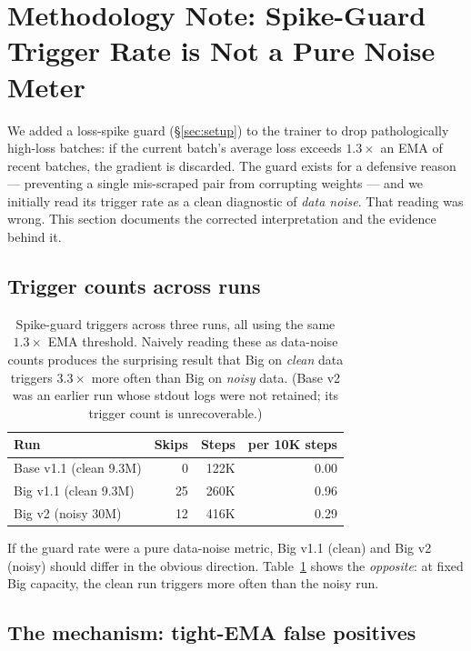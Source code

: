 \section{Methodology Note: Spike-Guard Trigger Rate is Not a Pure Noise Meter}
\label{sec:methodology}

We added a loss-spike guard (\S\ref{sec:setup}) to the trainer to drop pathologically high-loss batches: if the current batch's average loss exceeds $1.3\times$ an EMA of recent batches, the gradient is discarded. The guard exists for a defensive reason --- preventing a single mis-scraped pair from corrupting weights --- and we initially read its trigger rate as a clean diagnostic of \emph{data noise}. That reading was wrong. This section documents the corrected interpretation and the evidence behind it.

\subsection{Trigger counts across runs}

\begin{table}[t]
\centering
\small
\begin{tabular}{lrrr}
\toprule
\textbf{Run}                 & \textbf{Skips} & \textbf{Steps} & \textbf{per 10K steps} \\
\midrule
Base v1.1 (clean 9.3M)       & 0   & 122K & 0.00 \\
Big  v1.1 (clean 9.3M)       & 25  & 260K & 0.96 \\
Big  v2   (noisy 30M)        & 12  & 416K & 0.29 \\
\bottomrule
\end{tabular}
\caption{Spike-guard triggers across three runs, all using the same $1.3\times$ EMA threshold. Naively reading these as data-noise counts produces the surprising result that Big on \emph{clean} data triggers $3.3\times$ more often than Big on \emph{noisy} data. (Base v2 was an earlier run whose stdout logs were not retained; its trigger count is unrecoverable.)}
\label{tab:spike_rates}
\end{table}

If the guard rate were a pure data-noise metric, Big v1.1 (clean) and Big v2 (noisy) should differ in the obvious direction. Table~\ref{tab:spike_rates} shows the \emph{opposite}: at fixed Big capacity, the clean run triggers more often than the noisy run.

\subsection{The mechanism: tight-EMA false positives}

